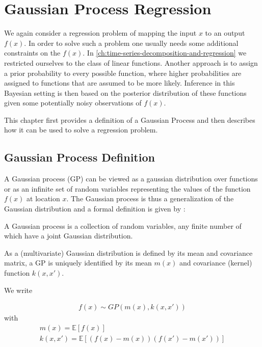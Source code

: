 \chapter{Gaussian Process Regression}\label{ch:gaussian-process-regression}


We again consider a regression problem of mapping the input $x$ to an output $f(x)$.
In order to solve such a problem one usually needs some additional constraints on the $f(x)$.
In \ref{ch:time-series-decomposition-and-regression} we restricted ourselves to the class of linear functions.
Another approach is to assign a prior probability to every possible function, where higher
probabilities are assigned to functions that are assumed to be more likely.
Inference in this Bayesian setting is then based on the posterior distribution of these
functions given some potentially noisy observations of $f(x)$.

This chapter first provides a definition of a Gaussian Process and then describes how it
can be used to solve a regression problem.

\section{Gaussian Process Definition}\label{sec:gaussian-process-definition}

A Gaussian process (GP) can be viewed as a gaussian distribution over functions or as an infinite set of random
variables representing the values of the function $f(x)$ at location $x$.
The Gaussian process is thus a generalization of the Gaussian distribution and a formal definition is given
by \citeauthor{rasmussen_gaussian_2006} :

\begin{definition}\label{def:GP}
 A Gaussian process is a collection of random variables, any finite number of which have a joint Gaussian distribution.
\end{definition}


As a (multivariate) Gaussian distribution is defined by its mean and covariance matrix, a GP is
uniquely identified by its mean $m(x)$ and covariance (kernel) function $k(x,x')$.

We write

\begin{gather*}
    f(x) \sim GP(m(x), k(x,x'))
\end{gather*}
with
\begin{gather*}
    m(x) = \mathbb{E}[f(x)] \\
    k(x,x') = \mathbb{E}[(f(x)-m(x))(f(x')-m(x'))]
\end{gather*}

